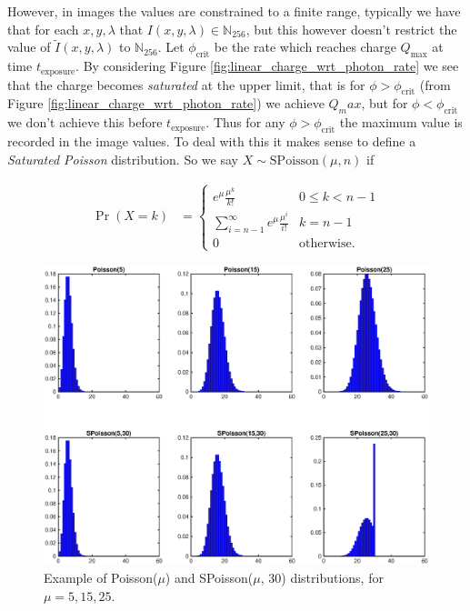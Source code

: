 \documentclass[12pt,twoside,notitlepage]{report}
\newcommand{\bb}[1]{\mathbb{#1}}
\begin{document}
        However, in images the values are constrained to a finite range, typically we have that for each $x, y, 
        \lambda$ that $I(x,y,\lambda) \in \bb{N}_{256}$, but this however doesn't restrict the value of
        $\tilde{I}(x,y,\lambda)$ to $\bb{N}_{256}$. Let $\phi_{\text{crit}}$ be the rate which reaches charge 
        $Q_{\text{max}}$ at time $t_{\text{exposure}}$. By considering Figure \ref{fig:linear_charge_wrt_photon_rate} 
        we see that the charge becomes \textit{saturated} at the upper limit, that is for $\phi > \phi_{\text{crit}}$
        (from Figure \ref{fig:linear_charge_wrt_photon_rate}) we achieve $Q_max$, but for $\phi < \phi_{\text{crit}}$ 
        we don't achieve this before $t_{\text{exposure}}$. Thus for any $\phi > \phi_{\text{crit}}$ the maximum 
        value is recorded in the image values. To deal with this it makes sense to define a 
        \textit{Saturated Poisson} distribution. So we say $X \sim \text{SPoisson}(\mu, n)$ if 

        \begin{align}
            \Pr(X = k) & = 
                \begin{cases}
                    e^{\mu} \frac{\mu^k}{k!} & 0 \leq k < n-1 \\
                    \sum\limits_{i=n-1}^\infty e^{\mu} \frac{\mu^i}{i!} & k = n-1 \\
                    0 & \text{otherwise}.
                \end{cases} 
        \end{align}

        \begin{figure}[H]
            \centering 
            \includegraphics[scale=0.5]{poisson_distributions}
            \caption[Example of Poisson($\mu$) and SPoisson($\mu$, 30) distributions.]{Example of Poisson($\mu$) and SPoisson($\mu$, 30) distributions, for $\mu = 5,15,25$.}
        \end{figure}
\end{document}
